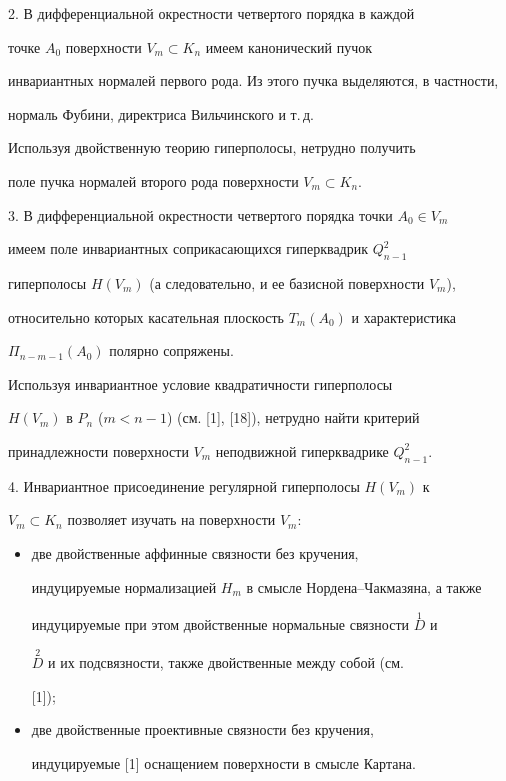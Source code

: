 2. В дифференциальной окрестности четвертого порядка в каждой 


точке $A_0$ поверхности $V_m\subset K_n$ имеем канонический пучок 


инвариантных нормалей первого рода. Из этого пучка выделяются, в частности, 


нормаль Фубини, директриса Вильчинского и т.\,д. 


 


Используя двойственную теорию гиперполосы, нетрудно получить 


поле пучка нормалей второго рода поверхности $V_m\subset K_n$. 


 


3. В дифференциальной окрестности четвертого порядка точки $A_0\in V_m$ 


имеем поле инвариантных соприкасающихся гиперквадрик $Q^2_{n-1}$ 


гиперполосы $H(V_m)$ (а следовательно, и ее базисной поверхности $V_m$), 


относительно которых касательная плоскость $T_m(A_0)$ и характеристика 


$\Pi_{n-m-1}(A_0)$ полярно сопряжены. 


 


Используя инвариантное условие квадратичности гиперполосы 


$H(V_m)$ в $P_n$ ($m<n-1$) (см. [1], [18]), нетрудно найти критерий 


принадлежности поверхности $V_m$ неподвижной гиперквадрике $Q^2_{n-1}$. 


 


4. Инвариантное присоединение регулярной гиперполосы $H(V_m)$ к 


$V_m\subset K_n$ позволяет изучать на поверхности $V_m$: 


\begin{itemize} 


\item[а)] две двойственные аффинные связности без кручения, 


индуцируемые нормализацией $H_m$ в смысле Нордена--Чакмазяна, а также 


индуцируемые при этом двойственные нормальные связности $\overset{1}{D}$ и 


$\overset{2}{D}$ и их подсвязности, также двойственные между собой (см. 


[1]); 


\item[б)] две двойственные проективные связности без кручения, 


индуцируемые [1] оснащением поверхности в смысле Картана. 


\end{itemize} 


